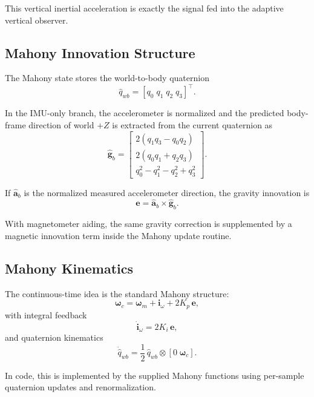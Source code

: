 \documentclass[conference]{IEEEtran}
\newcommand{\vct}[1]{\bm{#1}}
\begin{document}
This vertical inertial acceleration is exactly the signal fed into the
adaptive vertical observer.

\subsection{Mahony Innovation Structure}

The Mahony state stores the world-to-body quaternion
\begin{equation}
\hat{q}_{wb} = [q_0\;q_1\;q_2\;q_3]^\top.
\end{equation}

In the IMU-only branch, the accelerometer is normalized and the predicted
body-frame direction of world \(+Z\) is extracted from the current quaternion
as
\begin{equation}
\hat{\vct{g}}_b =
\begin{bmatrix}
2(q_1 q_3 - q_0 q_2)\\
2(q_0 q_1 + q_2 q_3)\\
q_0^2 - q_1^2 - q_2^2 + q_3^2
\end{bmatrix}.
\end{equation}

If \(\hat{\vct{a}}_b\) is the normalized measured accelerometer direction, the
gravity innovation is
\begin{equation}
\vct{e} = \hat{\vct{a}}_b \times \hat{\vct{g}}_b.
\end{equation}

With magnetometer aiding, the same gravity correction is supplemented by a
magnetic innovation term inside the Mahony update routine.

\subsection{Mahony Kinematics}

The continuous-time idea is the standard Mahony structure:
\begin{equation}
\vct{\omega}_c = \vct{\omega}_m + \vct{i}_{\omega} + 2K_p\,\vct{e},
\end{equation}
with integral feedback
\begin{equation}
\dot{\vct{i}}_{\omega} = 2K_i\,\vct{e},
\end{equation}
and quaternion kinematics
\begin{equation}
\dot{\hat{q}}_{wb}
=
\frac12\,\hat{q}_{wb}\otimes [0\;\vct{\omega}_c].
\end{equation}

In code, this is implemented by the supplied Mahony functions using
per-sample quaternion updates and renormalization.
\end{document}
